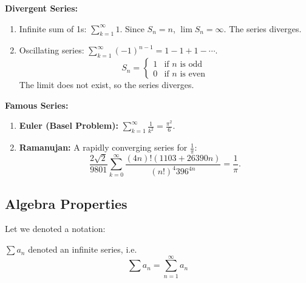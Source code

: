\documentclass[
	UTF-8,
	11pt, %
	a4paper, %
]{LegrandOrangeBook}
\begin{document}
    \begin{example}
    \textbf{Divergent Series:}
    \begin{enumerate}
        \item Infinite sum of 1s: $\sum_{k=1}^{\infty} 1$. Since $S_n = n$, $\lim S_n = \infty$. The series diverges.
        \item Oscillating series: $\sum_{k=1}^{\infty} (-1)^{n-1} = 1 - 1 + 1 - \cdots$.
        \[ S_n = \begin{cases} 1 & \text{if } n \text{ is odd} \\ 0 & \text{if } n \text{ is even} \end{cases} \]
        The limit does not exist, so the series diverges.
    \end{enumerate}
    \end{example}

    \newpage

    \begin{example}
    \textbf{Famous Series:}
    \begin{enumerate}
        \item \textbf{Euler (Basel Problem):} $\displaystyle \sum_{k=1}^{\infty} \frac{1}{k^2} = \frac{\pi^2}{6}$.
        \item \textbf{Ramanujan:} A rapidly converging series for $\frac{1}{\pi}$:
        \[ \frac{2\sqrt{2}}{9801} \sum_{k=0}^{\infty} \frac{(4n)!(1103 + 26390n)}{(n!)^4 396^{4n}} = \frac{1}{\pi}. \]
    \end{enumerate}
    \end{example}

    \subsection{Algebra Properties}

    Let we denoted a notation:

    \begin{notation}
        $\sum a_n$ denoted an infinite series, i.e.
        $$
        \sum a_n = \sum_{n=1}^{\infty} a_n
        $$
    \end{notation}
\end{document}
